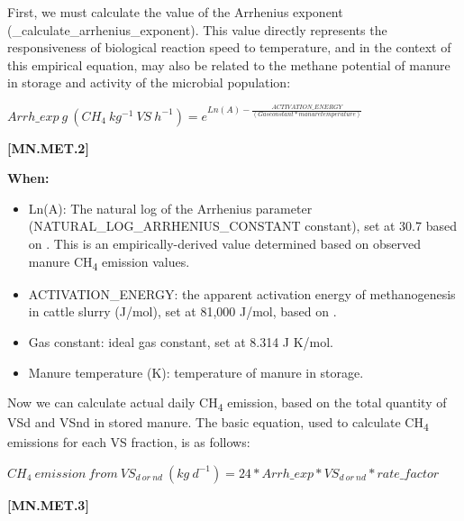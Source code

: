 \begin{refsection}
First, we must calculate the value of the Arrhenius exponent (\_calculate\_arrhenius\_exponent). This value directly represents the responsiveness of biological reaction speed to temperature, and in the context of this empirical equation, may also be related to the methane potential of manure in storage and activity of the microbial population:
\vspace{0.5cm}

    \begin{center}
\(Arrh\_exp\ g\ (CH_4\ kg^{-1}\ VS\ h^{-1}) = e ^{Ln(A) - \frac{ACTIVATION\_ENERGY}{(Gas constant * manure temperature)}}\)
    \end{center}
        \vspace{0.5cm} 
    
            {\raggedleft \textbf{[MN.MET.2]}\par}
            \vspace{0.5cm}

    \textbf{When:}
    \begin{itemize}
        \item Ln(A): The natural log of the Arrhenius parameter (NATURAL\_LOG\_ARRHENIUS\_CONSTANT constant), set at 30.7 based on \cite{Petersen2024}. This is an empirically-derived value determined based on observed manure CH\textsubscript{4} emission values.
        \item ACTIVATION\_ENERGY: the apparent activation energy of methanogenesis in cattle slurry (J/mol), set at 81,000 J/mol, based on \cite{Elsgaard2016}. 
        \item Gas constant: ideal gas constant, set at 8.314 J K/mol.
        \item Manure temperature (K): temperature of manure in storage. 
    \end{itemize}

Now we can calculate actual daily CH\textsubscript{4} emission, based on the total quantity of VSd and VSnd in stored manure. The basic equation, used to calculate CH\textsubscript{4} emissions for each VS fraction, is as follows:
\vspace{0.5cm}

    \begin{center}
\(CH_4\ emission\ from\ VS_{d\ or\ nd}\ (kg\ d^{-1}) = 24 * Arrh\_exp * VS_{d\ or\ nd} * rate\_factor\)
    \end{center}
        \vspace{0.5cm} 
    
            {\raggedleft \textbf{[MN.MET.3]}\par}
            \vspace{0.5cm}


\end{refsection}
